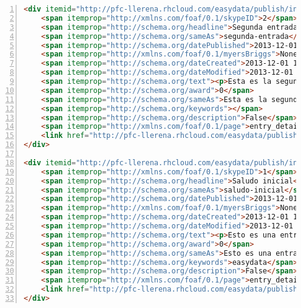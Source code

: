 \begin{lstlisting}[frame=L, language=HTML, basicstyle=\footnotesize, breaklines=true, numbers=left]
<div itemid="http://pfc-llerena.rhcloud.com/easydata/publish/instance/zinnia/BlogPosting-Entry/2.xml" itemtype="http://schema.org/BlogPosting" itemscope >
    <span itemprop="http://xmlns.com/foaf/0.1/skypeID">2</span>
    <span itemprop="http://schema.org/headline">Segunda entrada</span>
    <span itemprop="http://schema.org/sameAs">segunda-entrada</span>
    <span itemprop="http://schema.org/datePublished">2013-12-01 11:36:11</span>
    <span itemprop="http://xmlns.com/foaf/0.1/myersBriggs">None</span>
    <span itemprop="http://schema.org/dateCreated">2013-12-01 11:35:33</span>
    <span itemprop="http://schema.org/dateModified">2013-12-01 11:36:17.142964</span>
    <span itemprop="http://schema.org/text"><p>Esta es la segunda entrada del blog de zinnia.</p><p>Ten mucha suerte en tu Proyecto Fin de Carrera.</p></span>
    <span itemprop="http://schema.org/award">0</span>
    <span itemprop="http://schema.org/sameAs">Esta es la segunda entrada del blog de zinnia.Ten mucha suerte en tu Proyecto Fin de Carrera.</span>
    <span itemprop="http://schema.org/keywords"></span>
    <span itemprop="http://schema.org/description">False</span>
    <span itemprop="http://xmlns.com/foaf/0.1/page">entry_detail.html</span>
    <link href="http://pfc-llerena.rhcloud.com/easydata/publish/instance/zinnia/BlogPosting-Entry/1.xml" itemprop="http://schema.org/about">
</div>

<div itemid="http://pfc-llerena.rhcloud.com/easydata/publish/instance/zinnia/BlogPosting-Entry/1.xml" itemtype="http://schema.org/BlogPosting" itemscope >
    <span itemprop="http://xmlns.com/foaf/0.1/skypeID">1</span>
    <span itemprop="http://schema.org/headline">Saludo inicial</span>
    <span itemprop="http://schema.org/sameAs">saludo-inicial</span>
    <span itemprop="http://schema.org/datePublished">2013-12-01 11:01:17</span>
    <span itemprop="http://xmlns.com/foaf/0.1/myersBriggs">None</span>
    <span itemprop="http://schema.org/dateCreated">2013-12-01 11:00:40</span>
    <span itemprop="http://schema.org/dateModified">2013-12-01 11:01:36.367237</span>
    <span itemprop="http://schema.org/text"><p>Esto es una entrada de prueba para el blog de zinnia para probar junto con EasyData.</p></span>
    <span itemprop="http://schema.org/award">0</span>
    <span itemprop="http://schema.org/sameAs">Esto es una entrada de prueba para el blog de zinnia para probar junto con EasyData.</span>
    <span itemprop="http://schema.org/keywords">easydata</span>
    <span itemprop="http://schema.org/description">False</span>
    <span itemprop="http://xmlns.com/foaf/0.1/page">entry_detail.html</span>
    <link href="http://pfc-llerena.rhcloud.com/easydata/publish/instance/zinnia/BlogPosting-Entry/2.xml" itemprop="http://schema.org/about">
</div>
\end{lstlisting}

